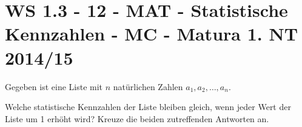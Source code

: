 \section{WS 1.3 - 12 - MAT - Statistische Kennzahlen - MC - Matura 1. NT 2014/15}

\begin{beispiel}[WS 1.3]{1}
Gegeben ist eine Liste mit $n$ natürlichen Zahlen $a_1,a_2, \ldots, a_n$. \leer

Welche statistische Kennzahlen der Liste bleiben gleich, wenn jeder Wert der Liste um 1 erhöht wird? Kreuze die beiden zutreffenden Antworten an.

\end{beispiel}